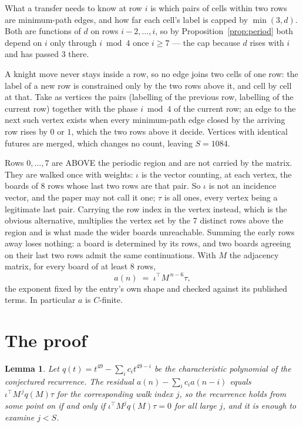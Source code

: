 \documentclass[11pt,a4paper]{article}
\theoremstyle{plain}
\newtheorem{lemma}[theorem]{Lemma}
\theoremstyle{definition}
\begin{document}
What a transfer needs to know at row $i$ is which pairs of cells within two rows are minimum-path edges, and how far each cell's label is capped by $\min(3,d)$. Both are functions of $d$ on rows $i-2,\dots,i$, so by Proposition~\ref{prop:period} both depend on $i$ only through $i\bmod 4$ once $i\ge7$ --- the cap because $d$ rises with $i$ and has passed $3$ there.

A knight move never stays inside a row, so no edge joins two cells of one row: the label of a new row is constrained only by the two rows above it, and cell by cell at that. Take as vertices the pairs (labelling of the previous row, labelling of the current row) together with the phase $i\bmod 4$ of the current row; an edge to the next such vertex exists when every minimum-path edge closed by the arriving row rises by $0$ or $1$, which the two rows above it decide. Vertices with identical futures are merged, which changes no count, leaving $S=1084$.

Rows $0,\dots,7$ are ABOVE the periodic region and are not carried by the matrix. They are walked once with weights: $\iota$ is the vector counting, at each vertex, the boards of $8$ rows whose last two rows are that pair. So $\iota$ is not an incidence vector, and the paper may not call it one; $\tau$ is all ones, every vertex being a legitimate last pair. Carrying the row index in the vertex instead, which is the obvious alternative, multiplies the vertex set by the $7$ distinct rows above the region and is what made the wider boards unreachable. Summing the early rows away loses nothing: a board is determined by its rows, and two boards agreeing on their last two rows admit the same continuations. With $M$ the adjacency matrix, for every board of at least $8$ rows,
\[
a(n)\;=\;\iota^{\!\top}M^{\,n-6}\tau ,
\]
the exponent fixed by the entry's own shape and checked against its published terms. In
particular $a$ is $C$-finite.

\section{The proof}

\begin{lemma}\label{lem:crit}
Let $q(t)=t^{49}-\sum_i c_it^{49-i}$ be the characteristic polynomial of the
conjectured recurrence. The residual $a(n)-\sum_ic_ia(n-i)$ equals
$\iota^{\!\top}M^{\,j}q(M)\tau$ for the corresponding walk index $j$, so the recurrence
holds from some point on if and only if $\iota^{\!\top}M^{j}q(M)\tau=0$ for all large $j$,
and it is enough to examine $j<S$.
\end{lemma}
\end{document}
